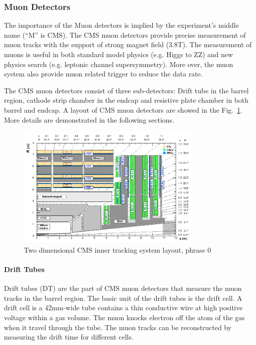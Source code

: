 \subsubsection{Muon Detectors}

The importance of the Muon detectors is implied by the experiment’s middle name (“M” is CMS). The CMS muon detectors provide precise measurement of muon tracks with the support of strong magnet field (3.8T). The measurement of muons is useful in both standard model physics (e.g. Higgs to ZZ) and new physics search (e.g. leptonic channel supersymmetry). More over, the muon system also provide muon related trigger to reduce the data rate.

The CMS muon detectors consist of three sub-detectors: Drift tube in the barrel region, cathode strip chamber in the endcap and resistive plate chamber in both barrel and endcap. A layout of CMS muon detectors are showed in the Fig.~\ref{fig:c3cms2dmuondets}. More details are demonstrated in the following sections. 

\begin{figure}[htbp]
 \begin{center}
  \includegraphics[width=0.8\textwidth]{figures/c3/c3_cms_2dmuondets.png}
 \end{center}
 \caption{Two dimensional CMS inner tracking system layout, phrase 0}
 \label{fig:c3cms2dmuondets}
\end{figure}

\paragraph{Drift Tubes}
Drift tubes (DT) are the part of CMS muon detectors that measure the muon tracks in the barrel region. The basic unit of the drift tubes is the drift cell. A drift cell is a 42mm-wide tube contains a thin conductive wire at high positive voltage within a gas volume. The muon knocks electron off the atom of the gas when it travel through the tube. The muon tracks can be reconstructed by measuring the drift time for different cells. 

